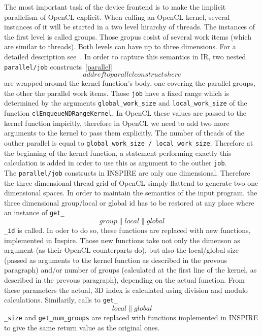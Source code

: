 The most important task of the device frontend is to make the implicit parallelism of OpenCL explicit. When calling an OpenCL kernel, several instances of it will be started in a two level hirarchy of threads. The instances of the first level is called groups. Those gropus cosist of several work items (which are similar to threads). Both levels can have up to three dimensions. For a detailed description see~\cite{oclRef}. In order to capture this semantics in IR, two nested \texttt{parallel/job} constructs~\ref{parallel}\[add ref to parallel constructs here\] are wrapped around the kernel function's body, one covering the parallel groups, the other the parallel work items. Those \texttt{job} have a fixed range which is determined by the arguments \texttt{global\_work\_size} and \texttt{local\_work\_size} of the function \texttt{clEnqueueNDRangeKernel}. In OpenCL these values are passed to the kernel function impicitly, therefore in OpenCL we need to add two more arguments to the kernel to pass them explicitly. The number of theads of the outher parallel is equal to \texttt{global\_work\_size / local\_work\_size}. Therefore at the beginning of the kernel function, a statement performing exactly this calculation is added in order to use this as argument to the outher \texttt{job}. \\

The \texttt{parallel/job} constructs in INSPIRE are only one dimensional. Therefore the three dimensional thread grid of OpenCL simply flattend to generate two one dimensional spaces. In order to maintain the semantics of the input program, the three dimensional group/local or global id has to be restored at any place where an instance of \texttt{get\_\[group\|local\|global\]\_id} is called. In oder to do so, these functions are replaced with new functions, implemented in Inspire. Those new functions take not only the dimenson as argument (as their OpenCL counterparts do), but also the local/global size (passed as arguments to the kernel function as described in the prevous paragraph) and/or number of groups (calculated at the first line of the kernel, as described in the prevous paragraph), depending on the actual function. From these parameters the actual, 3D index is calculated using division and modulo calculations. Similarily, calls to \texttt{get\_\[local\|global\]\_size} and \texttt{get\_num\_groups} are replaced with functions implemented in INSPIRE to give the same return value as the original ones.

